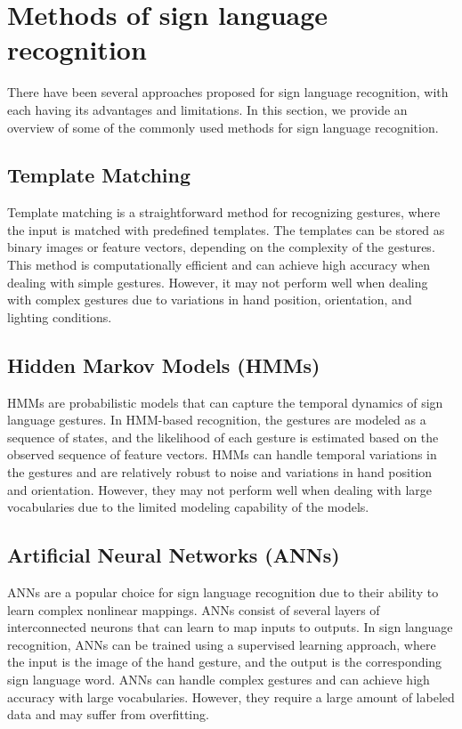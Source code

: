 \section{Methods of sign language recognition}
There have been several approaches proposed for sign language recognition, with each having its advantages and limitations. In this section, we provide an overview of some of the commonly used methods for sign language recognition.

\subsection{Template Matching}
Template matching is a straightforward method for recognizing gestures, where the input is matched with predefined templates. The templates can be stored as binary images or feature vectors, depending on the complexity of the gestures. This method is computationally efficient and can achieve high accuracy when dealing with simple gestures. However, it may not perform well when dealing with complex gestures due to variations in hand position, orientation, and lighting conditions.

\subsection{Hidden Markov Models (HMMs)}
HMMs are probabilistic models that can capture the temporal dynamics of sign language gestures. In HMM-based recognition, the gestures are modeled as a sequence of states, and the likelihood of each gesture is estimated based on the observed sequence of feature vectors. HMMs can handle temporal variations in the gestures and are relatively robust to noise and variations in hand position and orientation. However, they may not perform well when dealing with large vocabularies due to the limited modeling capability of the models.

\subsection{Artificial Neural Networks (ANNs)}
ANNs are a popular choice for sign language recognition due to their ability to learn complex nonlinear mappings. ANNs consist of several layers of interconnected neurons that can learn to map inputs to outputs. In sign language recognition, ANNs can be trained using a supervised learning approach, where the input is the image of the hand gesture, and the output is the corresponding sign language word. ANNs can handle complex gestures and can achieve high accuracy with large vocabularies. However, they require a large amount of labeled data and may suffer from overfitting.

